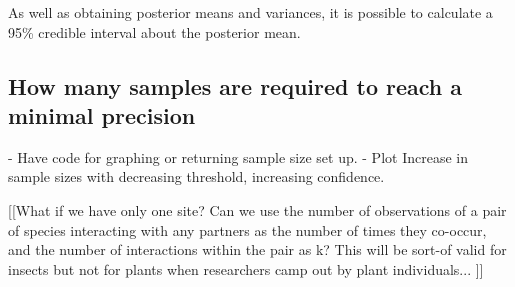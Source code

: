 \documentclass[12pt]{article}
\begin{document}
      As well as obtaining posterior means and variances, it is possible to calculate a 95\% credible interval about the posterior mean. 


  \subsection*{How many samples are required to reach a minimal precision}


    - Have code for graphing or returning sample size set up.
    - Plot Increase in sample sizes with decreasing threshold, increasing confidence.




  [[What if we have only one site? Can we use the number of observations of a pair of species interacting with any partners as the number of times they co-occur, and the number of interactions within the pair as k? This will be sort-of valid for insects but not for plants when researchers camp out by plant individuals... ]]


\clearpage

     
\end{document}
